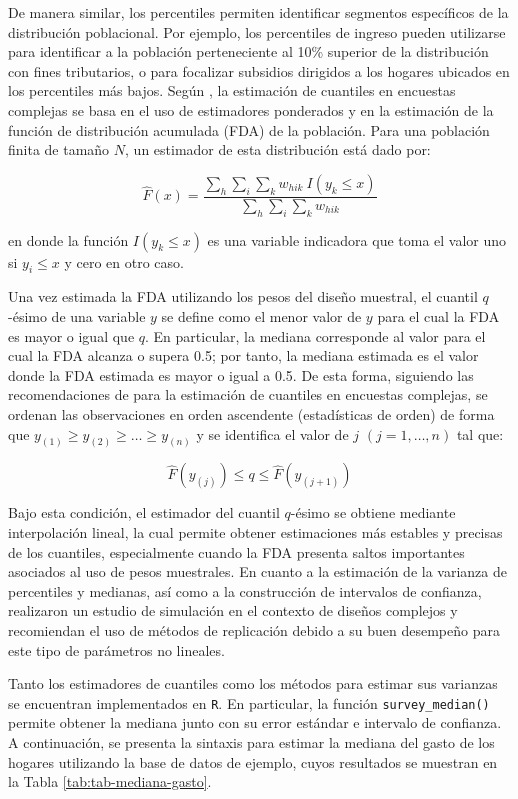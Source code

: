 \documentclass[
  spanish,
  12pt,
]{book}
\begin{document}
De manera similar, los percentiles permiten identificar segmentos específicos de la distribución poblacional. Por ejemplo, los percentiles de ingreso pueden utilizarse para identificar a la población perteneciente al 10\% superior de la distribución con fines tributarios, o para focalizar subsidios dirigidos a los hogares ubicados en los percentiles más bajos. Según \citet{loomis2005}, la estimación de cuantiles en encuestas complejas se basa en el uso de estimadores ponderados y en la estimación de la función de distribución acumulada (FDA) de la población. Para una población finita de tamaño \(N\), un estimador de esta distribución está dado por:

\[
\hat{F}\left(x\right) = \frac{\sum_{h} \sum_{i} \sum_{k} w_{hik} \ I\left(y_{k}\leq x\right)}{\sum_{h}\sum_{i}\sum_{k} w_{hik}}
\]

en donde la función \(I\left(y_{k}\leq x\right)\) es una variable indicadora que toma el valor uno si \(y_i \leq x\) y cero en otro caso.

Una vez estimada la FDA utilizando los pesos del diseño muestral, el cuantil \(q\)-ésimo de una variable \(y\) se define como el menor valor de \(y\) para el cual la FDA es mayor o igual que \(q\). En particular, la mediana corresponde al valor para el cual la FDA alcanza o supera 0.5; por tanto, la mediana estimada es el valor donde la FDA estimada es mayor o igual a 0.5. De esta forma, siguiendo las recomendaciones de \citet{heeringa2017applied} para la estimación de cuantiles en encuestas complejas, se ordenan las observaciones en orden ascendente (estadísticas de orden) de forma que \(y_{(1)} \geq y_{(2)} \geq  \ldots \geq y_{(n)}\) y se identifica el valor de \(j\) \((j=1,\ldots,n)\) tal que:

\[
\hat{F}\left(y_{(j)}\right)\leq q\leq\hat{F}\left(y_{(j+1)}\right)
\]

Bajo esta condición, el estimador del cuantil \(q\)-ésimo se obtiene mediante interpolación lineal, la cual permite obtener estimaciones más estables y precisas de los cuantiles, especialmente cuando la FDA presenta saltos importantes asociados al uso de pesos muestrales. En cuanto a la estimación de la varianza de percentiles y medianas, así como a la construcción de intervalos de confianza, \citet{kovar1988} realizaron un estudio de simulación en el contexto de diseños complejos y recomiendan el uso de métodos de replicación debido a su buen desempeño para este tipo de parámetros no lineales.

Tanto los estimadores de cuantiles como los métodos para estimar sus varianzas se encuentran implementados en \texttt{R}. En particular, la función \texttt{survey\_median()} permite obtener la mediana junto con su error estándar e intervalo de confianza. A continuación, se presenta la sintaxis para estimar la mediana del gasto de los hogares utilizando la base de datos de ejemplo, cuyos resultados se muestran en la Tabla \ref{tab:tab-mediana-gasto}.
\end{document}
